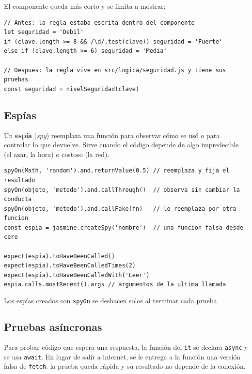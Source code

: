 \documentclass[11pt,a4paper]{article}
\newcommand{\cmd}[1]{\texttt{\color{reactdark}#1}}
\begin{document}
El componente queda más corto y se limita a mostrar:
\begin{lstlisting}[language=JSX]
// Antes: la regla estaba escrita dentro del componente
let seguridad = 'Debil'
if (clave.length >= 8 && /\d/.test(clave)) seguridad = 'Fuerte'
else if (clave.length >= 6) seguridad = 'Media'

// Despues: la regla vive en src/logica/seguridad.js y tiene sus pruebas
const seguridad = nivelSeguridad(clave)
\end{lstlisting}

\subsection{Espías}

Un \textbf{espía} (\emph{spy}) reemplaza una función para observar cómo se usó o para controlar lo que devuelve. Sirve cuando el código depende de algo impredecible (el azar, la hora) o costoso (la red).

\begin{lstlisting}[language=JSX]
spyOn(Math, 'random').and.returnValue(0.5) // reemplaza y fija el resultado
spyOn(objeto, 'metodo').and.callThrough()  // observa sin cambiar la conducta
spyOn(objeto, 'metodo').and.callFake(fn)   // lo reemplaza por otra funcion
const espia = jasmine.createSpy('nombre')  // una funcion falsa desde cero

expect(espia).toHaveBeenCalled()
expect(espia).toHaveBeenCalledTimes(2)
expect(espia).toHaveBeenCalledWith('Leer')
espia.calls.mostRecent().args // argumentos de la ultima llamada
\end{lstlisting}

Los espías creados con \cmd{spyOn} se deshacen solos al terminar cada prueba.

\subsection{Pruebas asíncronas}

Para probar código que espera una respuesta, la función del \cmd{it} se declara \cmd{async} y se usa \cmd{await}. En lugar de salir a internet, se le entrega a la función una versión falsa de \cmd{fetch}: la prueba queda rápida y su resultado no depende de la conexión.
\end{document}
